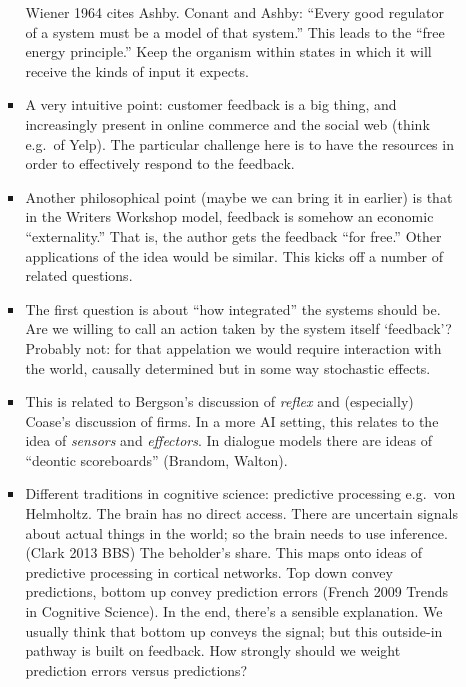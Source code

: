 \documentclass[letter]{article}
\begin{document}
\begin{mdframed}
\begin{enumerate}[start=4]
\begin{enumerate}
\begin{itemize}
  Wiener 1964 cites Ashby.  Conant and Ashby: ``Every good regulator
  of a system must be a model of that system.''  This leads to the
  ``free energy principle.''  Keep the organism within states in which
  it will receive the kinds of input it expects. 
\item A very intuitive point: customer feedback is a big thing, and
  increasingly present in online commerce and the social web (think
  e.g.~of Yelp).  The particular challenge here is to have the
  resources in order to effectively respond to the feedback.
\item Another philosophical point (maybe we can bring it in earlier)
  is that in the Writers Workshop model, feedback is somehow an
  economic ``externality.''  That is, the author gets the feedback
  ``for free.''  Other applications of the idea would be similar.
  This kicks off a number of related questions.
\item The first question is about ``how integrated'' the systems
  should be.  Are we willing to call an action taken by the system
  itself `feedback'?  Probably not: for that appelation we would
  require interaction with the world, causally determined but in some
  way stochastic effects.
\item This is related to Bergson's discussion of \emph{reflex} and
  (especially) Coase's discussion of firms.  In a more AI setting,
  this relates to the idea of \emph{sensors} and \emph{effectors}.  In
  dialogue models there are ideas of ``deontic scoreboards''
  (Brandom, Walton).
\item Different traditions in cognitive science: predictive processing
  e.g.~von Helmholtz.  The brain has no direct access.  There are
  uncertain signals about actual things in the world; so the brain
  needs to use inference.  (Clark 2013 BBS) The beholder's share.
  This maps onto ideas of predictive processing in cortical networks.
  Top down convey predictions, bottom up convey prediction errors
  (French 2009 Trends in Cognitive Science).  In the end, there's a
  sensible explanation.  We usually think that bottom up conveys the
  signal; but this outside-in pathway is built on feedback.  How
  strongly should we weight prediction errors versus predictions?
\end{itemize}
\end{enumerate}
\end{enumerate}
\end{mdframed}
\end{document}
